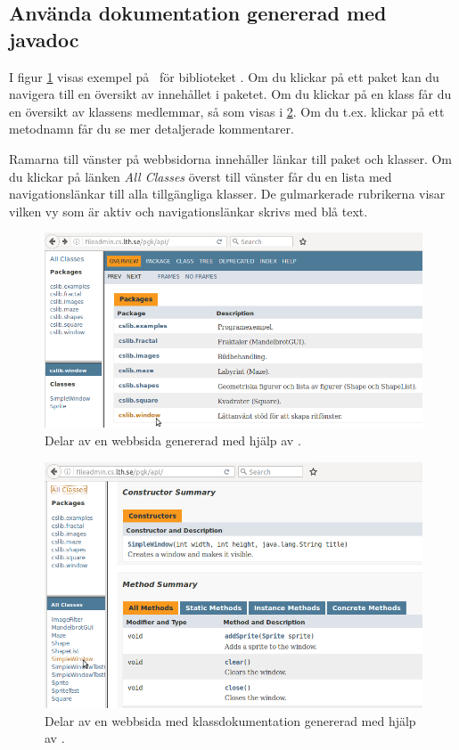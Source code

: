 \subsection{Använda dokumentation genererad med javadoc}

I figur \ref{fig:javadoc:overview} visas exempel på \javadoc\ för biblioteket . Om du klickar på ett paket kan du navigera till en översikt av innehållet i paketet. Om du klickar på en klass får du en översikt av klassens medlemmar, så som visas i \ref{fig:javadoc:class}.  Om du t.ex. klickar på ett metodnamn får du se mer detaljerade kommentarer.

Ramarna till vänster på webbsidorna innehåller länkar till paket och klasser. Om du klickar på länken \textit{All Classes} överst till vänster får du en lista med navigationslänkar till alla tillgängliga klasser. De gulmarkerade rubrikerna visar vilken vy som är aktiv och navigationslänkar skrivs med blå text.

\begin{figure}
\includegraphics[width=1.0\textwidth]{../img/javadoc/javadoc-overview}
    \caption{Delar av en webbsida genererad med hjälp av \javadoc.}
    \label{fig:javadoc:overview}
\end{figure}



\begin{figure}
\includegraphics[width=1.0\textwidth]{../img/javadoc/javadoc-class}
    \caption{Delar av en webbsida med klassdokumentation genererad med hjälp av \javadoc.}
    \label{fig:javadoc:class}
\end{figure}






